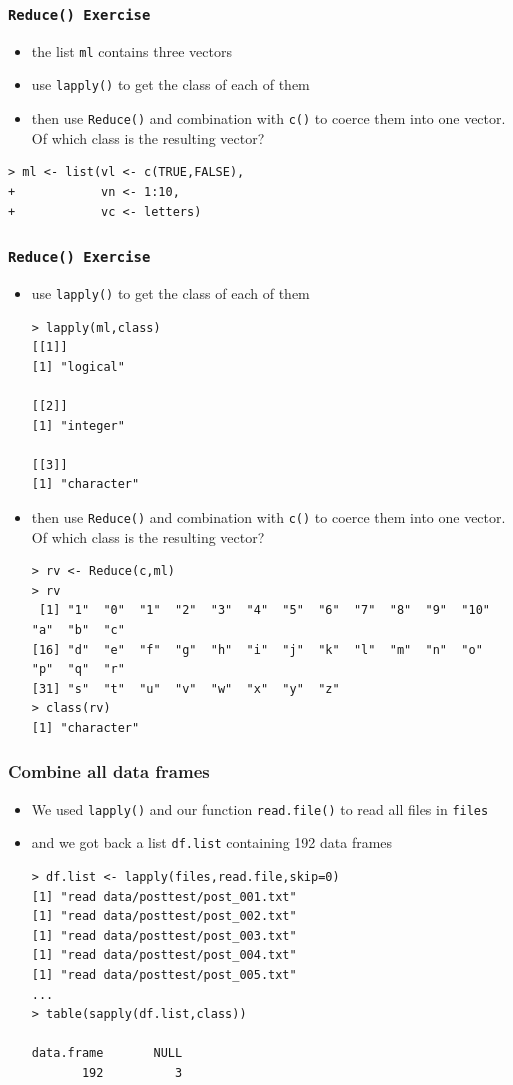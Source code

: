 \documentclass[xcolor={table},c]{beamer}
\begin{document}
\begin{frame}[fragile]\frametitle{\texttt{Reduce() Exercise}}
  \begin{itemize}
  \item the list \texttt{ml} contains three vectors
  \item use \texttt{lapply()} to get the class of each of them
  \item then use \texttt{Reduce()} and combination with \texttt{c()} to coerce them into one vector. Of which class is the resulting vector?
  \end{itemize}
\begin{verbatim}
> ml <- list(vl <- c(TRUE,FALSE),
+            vn <- 1:10,
+            vc <- letters)
\end{verbatim}
\end{frame}



\begin{frame}[fragile]\frametitle{\texttt{Reduce() Exercise}}
  \begin{itemize}
  \item use \texttt{lapply()} to get the class of each of them

  \scriptsize
\begin{verbatim}
> lapply(ml,class)
[[1]]
[1] "logical"

[[2]]
[1] "integer"

[[3]]
[1] "character"
\end{verbatim} 
\normalsize
  \item then use \texttt{Reduce()} and combination with \texttt{c()} to coerce them into one vector. Of which class is the resulting vector?
\scriptsize
\begin{verbatim}
> rv <- Reduce(c,ml)
> rv
 [1] "1"  "0"  "1"  "2"  "3"  "4"  "5"  "6"  "7"  "8"  "9"  "10" "a"  "b"  "c" 
[16] "d"  "e"  "f"  "g"  "h"  "i"  "j"  "k"  "l"  "m"  "n"  "o"  "p"  "q"  "r" 
[31] "s"  "t"  "u"  "v"  "w"  "x"  "y"  "z" 
> class(rv)
[1] "character"
\end{verbatim}
\end{itemize}
\end{frame}


\begin{frame}[fragile]\frametitle{Combine all data frames}
  \begin{itemize}
  \item We used \texttt{lapply()} and our function \texttt{read.file()} to read all files in \texttt{files}
  \item and we got back a list \texttt{df.list} containing 192 data frames
\begin{verbatim}
> df.list <- lapply(files,read.file,skip=0)
[1] "read data/posttest/post_001.txt"
[1] "read data/posttest/post_002.txt"
[1] "read data/posttest/post_003.txt"
[1] "read data/posttest/post_004.txt"
[1] "read data/posttest/post_005.txt"
...
> table(sapply(df.list,class))

data.frame       NULL 
       192          3   
\end{verbatim}
  \end{itemize}
\end{frame}
\end{document}
